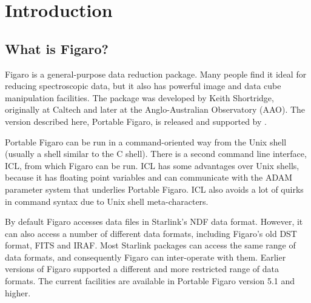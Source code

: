 \stardocabstract
 \newpage
 \begin{latexonly}
   \setlength{\parskip}{0mm}
   \latexonlytoc
   \setlength{\parskip}{\medskipamount}
 \end{latexonly}
\cleardoublepage
\renewcommand{\thepage}{\arabic{page}}
\setcounter{page}{1}

\section{\label{introduction}Introduction}

\subsection{What is Figaro?}

Figaro is a general-purpose data reduction package.
Many people find it ideal for reducing spectroscopic data, but it
also has powerful image and data cube manipulation facilities.
The package was developed by Keith Shortridge, originally at Caltech
and later at the Anglo-Australian Observatory (AAO).
The version described here, Portable Figaro, is released and supported
by .

Portable Figaro can be run in a command-oriented way from the Unix
shell (usually a shell similar to the C shell).
There is a second command line interface, ICL, from which Figaro can be run.
ICL has some advantages over Unix shells, because it has floating point
variables and can communicate with the ADAM parameter system that
underlies Portable Figaro.
ICL also avoids a lot of quirks in command syntax due to Unix shell
meta-characters.

By default Figaro accesses data files in Starlink's NDF data format.
However, it can also access a number of different data formats, including
Figaro's old DST format, FITS and IRAF.
Most Starlink packages can access the same range of data formats, and
consequently Figaro can inter-operate with them.
Earlier versions of Figaro supported a different and more restricted range
of data formats.
The current facilities are available in Portable Figaro version 5.1 and
higher.

